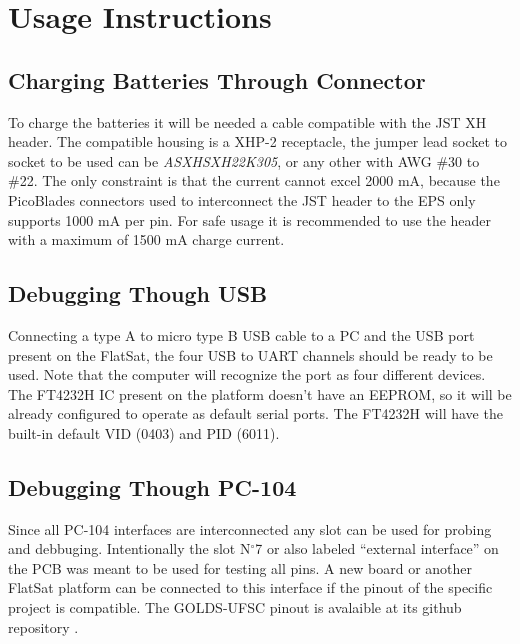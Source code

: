 %
%
%
%
%

%
%
%
%
%
%

\chapter{Usage Instructions} \label{ch:instructions}

\section{Charging Batteries Through Connector}

To charge the batteries it will be needed a cable compatible with the JST XH header. The compatible housing is a XHP-2 receptacle, the jumper lead socket to socket to be used can be \textit{ASXHSXH22K305}, or any other with AWG \#30 to \#22. The only constraint is that the current cannot excel 2000 mA, because the PicoBlades connectors used to interconnect the JST header to the EPS only supports 1000 mA per pin. For safe usage it is recommended to use the header with a maximum of 1500 mA charge current.

\section{Debugging Though USB}

Connecting a type A to micro type B USB cable to a PC and the USB port present on the FlatSat, the four USB to UART channels should be ready to be used. Note that the computer will recognize the port as four different devices. The FT4232H IC present on the platform  doesn't have an EEPROM, so it will be already configured to operate as default serial ports. The FT4232H will have the built-in default VID (0403) and PID (6011).

\section{Debugging Though PC-104}

Since all PC-104 interfaces are interconnected any slot can be used for probing and debbuging. Intentionally the slot N$^{\circ}$7 or also labeled ``external interface'' on the PCB was meant to be used for testing all pins. A new board or another FlatSat platform can be connected to this interface if the pinout of the specific project is compatible. The GOLDS-UFSC pinout is avalaible at its github repository \cite{golds-ufsc}.

